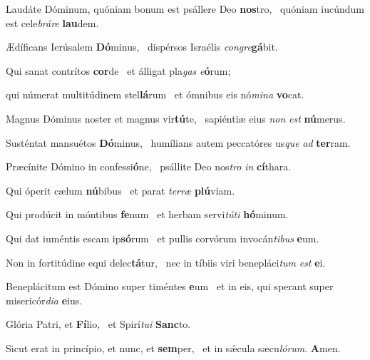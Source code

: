 \item Laudáte Dóminum, quóniam bonum est psállere Deo \textbf{nos}tro,~\psstar{} quóniam iucúndum est cele\textit{bráre} \textbf{lau}dem.

\item Ædíficans Ierúsalem \textbf{Dó}minus,~\psstar{} dispérsos Israélis \textit{congre}\textbf{gá}bit.

\item Qui sanat contrítos \textbf{cor}de~\psstar{} et álligat pla\textit{gas} \textit{e}\textbf{ó}rum;

\item qui númerat multitúdinem stel\textbf{lá}rum~\psstar{} et ómnibus eis nó\textit{mina} \textbf{vo}cat.

\item Magnus Dóminus noster et magnus vir\textbf{tú}te,~\psstar{} sapiéntiæ eius \textit{non} \textit{est} \textbf{nú}merus.

\item Susténtat mansuétos \textbf{Dó}minus,~\psstar{} humílians autem peccatóres us\textit{que} \textit{ad} \textbf{ter}ram.

\item Præcínite Dómino in confessi\textbf{ó}ne,~\psstar{} psállite Deo nos\textit{tro} \textit{in} \textbf{cí}thara.

\item Qui óperit cælum \textbf{nú}bibus~\psstar{} et parat \textit{terræ} \textbf{plú}viam.

\item Qui prodúcit in móntibus \textbf{fe}num~\psstar{} et herbam servi\textit{túti} \textbf{hó}minum.

\item Qui dat iuméntis escam ip\textbf{só}rum~\psstar{} et pullis corvórum invocán\textit{tibus} \textbf{e}um.

\item Non in fortitúdine equi delec\textbf{tá}tur,~\psstar{} nec in tíbiis viri benepláci\textit{tum} \textit{est} \textbf{e}i.

\item Beneplácitum est Dómino super timéntes \textbf{e}um~\psstar{} et in eis, qui sperant super misericór\textit{dia} \textbf{e}ius.

\item Glória Patri, et \textbf{Fí}lio,~\psstar{} et Spirí\textit{tui} \textbf{Sanc}to.

\item Sicut erat in princípio, et nunc, et \textbf{sem}per,~\psstar{} et in sǽcula sæcu\textit{lórum}. \textbf{A}men.